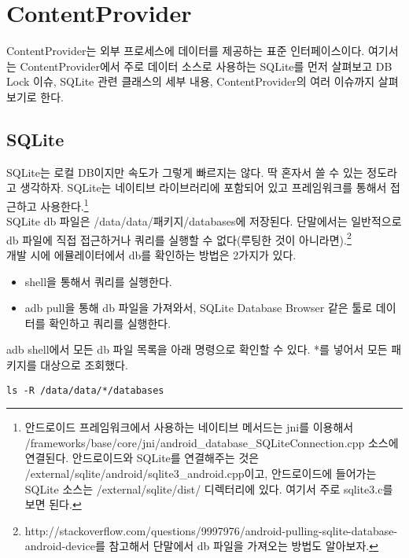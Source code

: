 \chapter{ContentProvider}
ContentProvider는 외부 프로세스에 데이터를 제공하는 표준 인터페이스이다. 
여기서는 ContentProvider에서 주로 데이터 소스로 사용하는 SQLite를 먼저 살펴보고 DB Lock 이슈, SQLite 관련 클래스의 세부 내용, ContentProvider의 여러 이슈까지 살펴보기로 한다.

\section{SQLite}\label{sec:sqlite}
SQLite는 로컬 DB이지만 속도가 그렇게 빠르지는 않다. 딱 혼자서 쓸 수 있는 정도라고 생각하자.
SQLite는 네이티브 라이브러리에 포함되어 있고 프레임워크를 통해서 접근하고 사용한다.\footnote{안드로이드 프레임워크에서 사용하는 네이티브 메서드는 jni를 이용해서 /frameworks/base/core/jni/android\_database\_SQLiteConnection.cpp 소스에 연결된다.
안드로이드와 SQLite를 연결해주는 것은 /external/sqlite/android/sqlite3\_android.cpp이고,
안드로이드에 들어가는 SQLite 소스는 /external/sqlite/dist/ 디렉터리에 있다. 여기서 주로 sqlite3.c를 보면 된다.}\\

SQLite db 파일은 /data/data/패키지/databases에 저장된다. 
단말에서는 일반적으로 db 파일에 직접 접근하거나 쿼리를 실행할 수 없다(루팅한 것이 아니라면).\footnote{http://stackoverflow.com/questions/9997976/android-pulling-sqlite-database-android-device를 참고해서 단말에서 db 파일을 가져오는 방법도 알아보자.}\\

개발 시에 에뮬레이터에서 db를 확인하는 방법은 2가지가 있다.
\begin{itemize}
\item shell을 통해서 쿼리를 실행한다.
\item adb pull을 통해 db 파일을 가져와서, SQLite Database Browser 같은 툴로 데이터를 확인하고 쿼리를 실행한다.
\end{itemize}

adb shell에서 모든 db 파일 목록을 아래 명령으로 확인할 수 있다. *를 넣어서 모든 패키지를 대상으로 조회했다. 
\begin{lstlisting}[frame=single]
 ls -R /data/data/*/databases 
\end{lstlisting}

